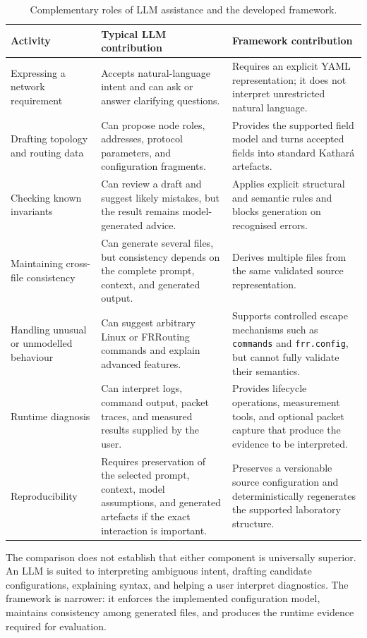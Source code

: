 \begin{table}[htbp]
\centering
\small
\begin{tabular}{p{} p{} p{}}
\toprule
\textbf{Activity} & \textbf{Typical LLM contribution} & \textbf{Framework contribution} \\
\midrule
Expressing a network requirement & Accepts natural-language intent and can ask or answer clarifying questions. & Requires an explicit YAML representation; it does not interpret unrestricted natural language. \\
Drafting topology and routing data & Can propose node roles, addresses, protocol parameters, and configuration fragments. & Provides the supported field model and turns accepted fields into standard Kathar\'a artefacts. \\
Checking known invariants & Can review a draft and suggest likely mistakes, but the result remains model-generated advice. & Applies explicit structural and semantic rules and blocks generation on recognised errors. \\
Maintaining cross-file consistency & Can generate several files, but consistency depends on the complete prompt, context, and generated output. & Derives multiple files from the same validated source representation. \\
Handling unusual or unmodelled behaviour & Can suggest arbitrary Linux or FRRouting commands and explain advanced features. & Supports controlled escape mechanisms such as \texttt{commands} and \texttt{frr.config}, but cannot fully validate their semantics. \\
Runtime diagnosis & Can interpret logs, command output, packet traces, and measured results supplied by the user. & Provides lifecycle operations, measurement tools, and optional packet capture that produce the evidence to be interpreted. \\
Reproducibility & Requires preservation of the selected prompt, context, model assumptions, and generated artefacts if the exact interaction is important. & Preserves a versionable source configuration and deterministically regenerates the supported laboratory structure. \\
\bottomrule
\end{tabular}
\caption{Complementary roles of LLM assistance and the developed framework.}
\label{tab:llm-framework-roles}
\end{table}

The comparison does not establish that either component is universally
superior. An LLM is suited to interpreting ambiguous intent, drafting candidate
configurations, explaining syntax, and helping a user interpret diagnostics.
The framework is narrower: it enforces the implemented configuration model,
maintains consistency among generated files, and produces the runtime evidence
required for evaluation.

